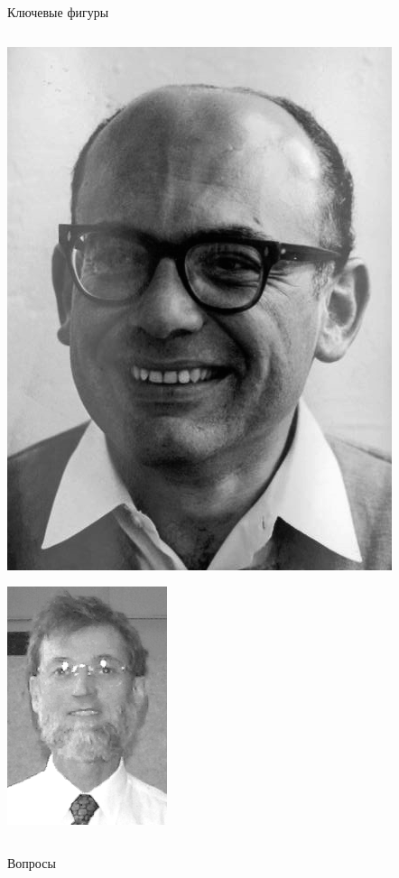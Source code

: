 \documentclass[10pt]{beamer}
\begin{document}
\begin{frame}{Ключевые фигуры}
\begin{columns}[T]
\begin{column}{.5\textwidth}
\begin{center}
	   \includegraphics[scale=0.3115]{images/breiman.png}   
	   
	   \vspace{0.3em}
	   \includegraphics[scale=0.32]{images/quinlan.png} 
    \end{center}	   
    \end{column}
  \end{columns}

\end{frame}

\begin{frame}[plain]
\begin{center}
{\Large Вопросы}
\end{center}
\end{frame}
\end{document}
